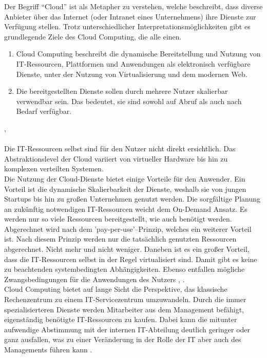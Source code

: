 Der Begriff "`Cloud"' ist als Metapher zu verstehen, welche beschreibt, dass diverse Anbieter über das Internet (oder Intranet eines Unternehmens) ihre Dienste zur Verfügung stellen. Trotz unterschiedlicher
Interpretationsmöglichkeiten gibt es grundlegende Ziele des Cloud Computing,
die alle einen.
\begin{enumerate}
  \item Cloud Computing beschreibt die dynamische Bereitstellung und Nutzung von IT-Ressourcen,
  Plattformen und Anwendungen als elektronisch verfügbare Dienste, unter der Nutzung
  von Virtualisierung und dem modernen Web.
  \item Die bereitgestellten Dienste sollen durch mehrere Nutzer skalierbar verwendbar
  sein. Das bedeutet, sie sind sowohl auf Abruf als auch nach Bedarf verfügbar.
\end{enumerate}
\cite{baun:cloudcomp}, \cite{wittig:awsinaction}
\\
\\
Die IT-Ressourcen selbst sind für den Nutzer nicht direkt ersichtlich. Das
Abstraktionslevel der Cloud variiert von virtueller Hardware bis hin zu komplexen verteilten Systemen.
\\ Die Nutzung der Cloud-Dienste bietet einige Vorteile für den Anwender. Ein Vorteil
ist die dynamische Skalierbarkeit der Dienste, weshalb
sie von jungen Startups bis hin zu großen Unternehmen genutzt werden. Die sorgfältige Planung an zukünftig notwendigen IT-Ressourcen weicht dem On-Demand Ansatz. Es werden nur so viele Ressourcen bereitgestellt, wie auch benötigt werden. Abgerechnet wird nach dem 'pay-per-use'--Prinzip, welches ein weiterer Vorteil ist.
Nach diesem Prinzip werden nur die tatsächlich genutzten Ressourcen abgerechnet.
Nicht mehr und nicht weniger. Daneben ist es ein großer Vorteil, dass die IT-Ressourcen
selbst in der Regel virtualisiert sind. Damit gibt es keine zu beachtenden systembedingten
Abhängigkeiten. Ebenso entfallen mögliche Zwangsbedingungen für die Anwendungen des Nutzers
\cite{baun:cloudcomp}, \cite{wittig:awsinaction}.
\\ Cloud Computing bietet auf lange Sicht die Perspektive, das klassische Rechenzentrum zu einem
IT-Servicezentrum umzuwandeln. Durch die immer spezialisierteren Dienste werden
Mitarbeiter aus dem Management befähigt, eigenständig benötigte IT-Ressourcen zu kaufen.
Dabei kann die mitunter aufwendige Abstimmung mit der internen IT-Abteilung deutlich
geringer oder ganz ausfallen,
was zu einer Veränderung in der Rolle der IT aber auch des Managements führen kann \cite{baun:cloudcomp}.

